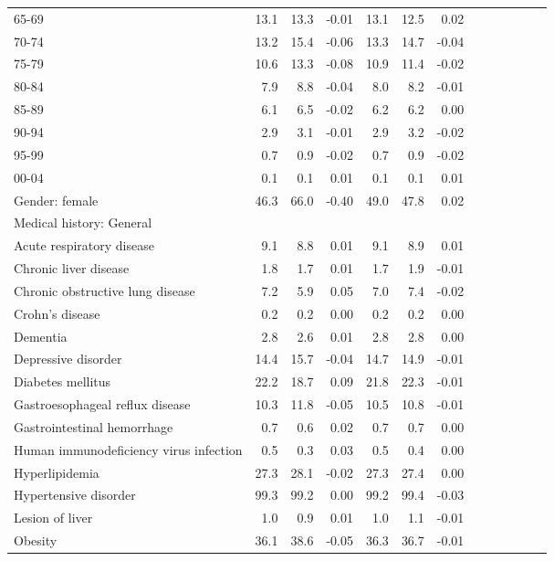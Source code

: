 \documentclass[11pt,]{article}
\begin{document}
\begin{longtable}{lrrrrrrrrrrrr}
      65-69 & 13.1 & 13.3 & -0.01 & 13.1 & 12.5 &  0.02 \\ 
      70-74 & 13.2 & 15.4 & -0.06 & 13.3 & 14.7 & -0.04 \\ 
      75-79 & 10.6 & 13.3 & -0.08 & 10.9 & 11.4 & -0.02 \\ 
      80-84 &  7.9 &  8.8 & -0.04 &  8.0 &  8.2 & -0.01 \\ 
      85-89 &  6.1 &  6.5 & -0.02 &  6.2 &  6.2 &  0.00 \\ 
      90-94 &  2.9 &  3.1 & -0.01 &  2.9 &  3.2 & -0.02 \\ 
      95-99 &  0.7 &  0.9 & -0.02 &  0.7 &  0.9 & -0.02 \\ 
      00-04 &  0.1 &  0.1 &  0.01 &  0.1 &  0.1 &  0.01 \\ 
  Gender: female & 46.3 & 66.0 & -0.40 & 49.0 & 47.8 &  0.02 \\ 
  Medical history: General &    &    &     &    &    &     \\ 
      Acute respiratory disease &  9.1 &  8.8 &  0.01 &  9.1 &  8.9 &  0.01 \\ 
      Chronic liver disease &  1.8 &  1.7 &  0.01 &  1.7 &  1.9 & -0.01 \\ 
      Chronic obstructive lung disease &  7.2 &  5.9 &  0.05 &  7.0 &  7.4 & -0.02 \\ 
      Crohn's disease &  0.2 &  0.2 &  0.00 &  0.2 &  0.2 &  0.00 \\ 
      Dementia &  2.8 &  2.6 &  0.01 &  2.8 &  2.8 &  0.00 \\ 
      Depressive disorder & 14.4 & 15.7 & -0.04 & 14.7 & 14.9 & -0.01 \\ 
      Diabetes mellitus & 22.2 & 18.7 &  0.09 & 21.8 & 22.3 & -0.01 \\ 
      Gastroesophageal reflux disease & 10.3 & 11.8 & -0.05 & 10.5 & 10.8 & -0.01 \\ 
      Gastrointestinal hemorrhage &  0.7 &  0.6 &  0.02 &  0.7 &  0.7 &  0.00 \\ 
      Human immunodeficiency virus infection &  0.5 &  0.3 &  0.03 &  0.5 &  0.4 &  0.00 \\ 
      Hyperlipidemia & 27.3 & 28.1 & -0.02 & 27.3 & 27.4 &  0.00 \\ 
      Hypertensive disorder & 99.3 & 99.2 &  0.00 & 99.2 & 99.4 & -0.03 \\ 
      Lesion of liver &  1.0 &  0.9 &  0.01 &  1.0 &  1.1 & -0.01 \\ 
      Obesity & 36.1 & 38.6 & -0.05 & 36.3 & 36.7 & -0.01 \\ 

\end{longtable}
\end{document}
